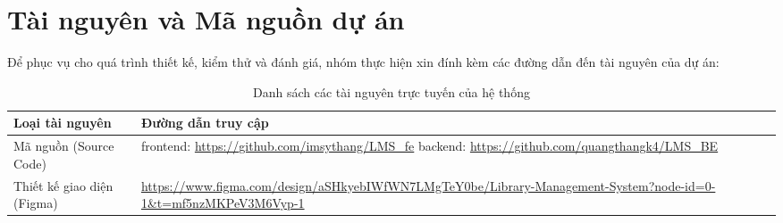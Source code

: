 \newpage
\chapter{Tài nguyên và Mã nguồn dự án}
\label{appendix:resources}

Để phục vụ cho quá trình thiết kế, kiểm thử và đánh giá, nhóm thực hiện xin đính kèm các đường dẫn đến tài nguyên của dự án:

\begin{table}[h]
\centering
\renewcommand{\arraystretch}{1.5}
\begin{tabular}{|l|p{10cm}|}
\hline
\textbf{Loại tài nguyên} & \textbf{Đường dẫn truy cập} \\ \hline
Mã nguồn (Source Code) & frontend: \url{https://github.com/imsythang/LMS_fe} \newline backend: \url{https://github.com/quangthangk4/LMS_BE}\\ \hline
Thiết kế giao diện (Figma) & \url{https://www.figma.com/design/aSHkyebIWfWN7LMgTeY0be/Library-Management-System?node-id=0-1&t=mf5nzMKPeV3M6Vyp-1} \\ \hline
\end{tabular}
\caption{Danh sách các tài nguyên trực tuyến của hệ thống}
\end{table}